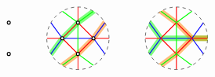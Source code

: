 \begin{figure}
\[\begin{tikzcd}
\begin{tikzpicture}[baseline=-.5ex]
\draw[thick,black,fill=white] (0,1/2) circle (0.05);
\draw[thick,black,fill=white] (0,-1/2) circle (0.05);
\end{tikzpicture}
& 
\begin{tikzpicture}[baseline=-.5ex]
\draw [dashed] (0,0) circle [radius=1];
\clip (0,0) circle (1);
\draw [color=cyclecolor2, line cap=round, line width=5, opacity=0.5] 
(210:1) -- (180:1/2)--(90:1/2)--(60:1);
\draw [color=cyclecolor1, line cap=round, line width=5, opacity=0.5] 
(240:1) -- (270:1/2)--(0:1/2)--(30:1);

\draw [blue, thick] ({-sqrt(3)/2},1/2)--(-1/2,0);
\draw [blue, thick] ({-sqrt(3)/2},-1/2)--(-1/2,0);
\draw [blue, thick] ({sqrt(3)/2},1/2)--(1/2,0);
\draw [blue, thick] ({sqrt(3)/2},-1/2)--(1/2,0);
\draw [blue, thick] (-1/2,0)--(1/2,0);

\draw [red, thick] (-1,0)--(-1/2,0) to (0,1/2) to (1/2,0)--(1,0);
\draw [red, thick] (-1/2,0) to (0, -1/2) to (1/2,0); 
\draw [red, thick] (0,1) to (0,1/2);
\draw [red, thick] (0,-1) to (0,-1/2);

\draw [green, thick] (-1/2,{sqrt(3)/2}) to (0,1/2) to (0,-1/2) to (-1/2,-{sqrt(3)/2});
\draw [green, thick] (1/2,{sqrt(3)/2})--(0,1/2);
\draw [green, thick] (1/2,-{sqrt(3)/2})--(0,-1/2);


\draw[thick,black,fill=white] (-1/2,0) circle (0.05);
\draw[thick,black,fill=white] (1/2,0) circle (0.05);

\draw[thick,black,fill=white] (0,1/2) circle (0.05);
\draw[thick,black,fill=white] (0,-1/2) circle (0.05);
\end{tikzpicture}
&
\begin{tikzpicture}[baseline=-.5ex]
\draw [dashed] (0,0) circle [radius=1];
\clip (0,0) circle (1);
\draw [color=cyclecolor2, line cap=round, line width=5, opacity=0.5] 
(210:1) -- (180:1/2)--(0:1) (150:1)--(180:1/2);
\draw [color=cyclecolor1, line cap=round, line width=5, opacity=0.5] 
(240:1) -- (270:1/2)--(0:1/2)--(0:1) (120:1)--(90:1/2)--(0:1/2);

\draw [blue, thick] ({-sqrt(3)/2},1/2)--(-1/2,0);
\draw [blue, thick] ({-sqrt(3)/2},-1/2)--(-1/2,0);
\draw [blue, thick] ({sqrt(3)/2},1/2)--(1/2,0);
\draw [blue, thick] ({sqrt(3)/2},-1/2)--(1/2,0);
\draw [blue, thick] (-1/2,0)--(1/2,0);

\draw [red, thick] (-1,0)--(-1/2,0) to (0,1/2) to (1/2,0)--(1,0);
\draw [red, thick] (-1/2,0) to (0, -1/2) to (1/2,0); 
\draw [red, thick] (0,1) to (0,1/2);
\draw [red, thick] (0,-1) to (0,-1/2);

\draw [green, thick] (-1/2,{sqrt(3)/2}) to (0,1/2) to (0,-1/2) to (-1/2,-{sqrt(3)/2});
\draw [green, thick] (1/2,{sqrt(3)/2})--(0,1/2);
\draw [green, thick] (1/2,-{sqrt(3)/2})--(0,-1/2);



\end{tikzpicture}
\end{tikzcd}\]
\end{figure}
